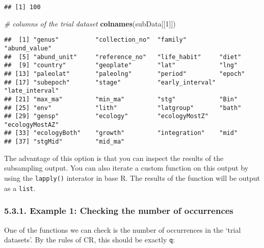 \documentclass[]{article}
\newenvironment{Shaded}{\begin{snugshade}}{\end{snugshade}}
\newcommand{\KeywordTok}[1]{\textcolor[rgb]{0.13,0.29,0.53}{\textbf{{#1}}}}
\newcommand{\DecValTok}[1]{\textcolor[rgb]{0.00,0.00,0.81}{{#1}}}
\newcommand{\StringTok}[1]{\textcolor[rgb]{0.31,0.60,0.02}{{#1}}}
\newcommand{\CommentTok}[1]{\textcolor[rgb]{0.56,0.35,0.01}{\textit{{#1}}}}
\newcommand{\NormalTok}[1]{{#1}}
\begin{document}
\begin{verbatim}
## [1] 100
\end{verbatim}

\begin{Shaded}
\begin{Highlighting}[]
\CommentTok{# columns of the trial dataset}
\KeywordTok{colnames}\NormalTok{(subData[[}\DecValTok{1}\NormalTok{]])}
\end{Highlighting}
\end{Shaded}

\begin{verbatim}
##  [1] "genus"          "collection_no"  "family"         "abund_value"   
##  [5] "abund_unit"     "reference_no"   "life_habit"     "diet"          
##  [9] "country"        "geoplate"       "lat"            "lng"           
## [13] "paleolat"       "paleolng"       "period"         "epoch"         
## [17] "subepoch"       "stage"          "early_interval" "late_interval" 
## [21] "max_ma"         "min_ma"         "stg"            "Bin"           
## [25] "env"            "lith"           "latgroup"       "bath"          
## [29] "gensp"          "ecology"        "ecologyMostZ"   "ecologyMostAZ" 
## [33] "ecologyBoth"    "growth"         "integration"    "mid"           
## [37] "stgMid"         "mid_ma"
\end{verbatim}

The advantage of this option is that you can inspect the results of the
subsampling output. You can also iterate a custom function on this
output by using the \texttt{lapply()} interator in base R. The results
of the function will be output as a \texttt{list}.

\subsubsection{5.3.1. Example 1: Checking the number of
occurrences}\label{example-1-checking-the-number-of-occurrences}

One of the functions we can check is the number of occurrences in the
`trial datasets'. By the rules of CR, this should be exactly \texttt{q}:

\begin{Shaded}
\end{Shaded}
\end{document}
